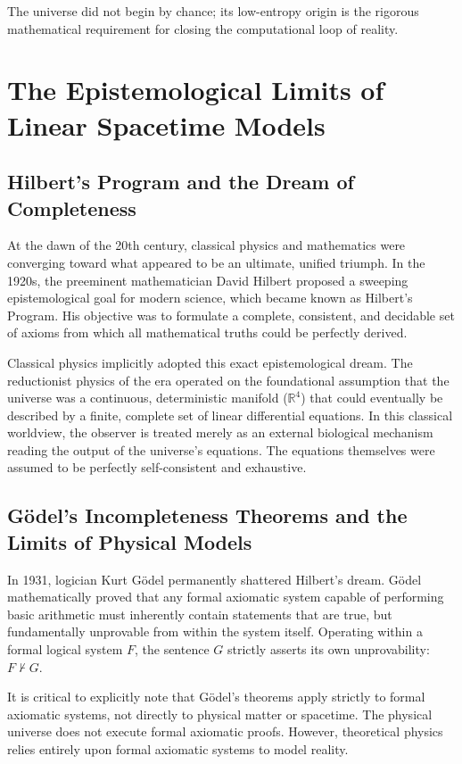 \documentclass[12pt,openany]{book}
\theoremstyle{plain}
\theoremstyle{definition}
\theoremstyle{remark}
\begin{document}
The universe did not begin by chance; its low-entropy origin is the rigorous mathematical requirement for closing the computational loop of reality.

\chapter{The Epistemological Limits of Linear Spacetime Models}

\section{Hilbert's Program and the Dream of Completeness}
At the dawn of the 20th century, classical physics and mathematics were converging toward what appeared to be an ultimate, unified triumph. In the 1920s, the preeminent mathematician David Hilbert proposed a sweeping epistemological goal for modern science, which became known as Hilbert's Program. His objective was to formulate a complete, consistent, and decidable set of axioms from which all mathematical truths could be perfectly derived.

Classical physics implicitly adopted this exact epistemological dream. The reductionist physics of the era operated on the foundational assumption that the universe was a continuous, deterministic manifold ($\mathbb{R}^4$) that could eventually be described by a finite, complete set of linear differential equations. In this classical worldview, the observer is treated merely as an external biological mechanism reading the output of the universe's equations. The equations themselves were assumed to be perfectly self-consistent and exhaustive.

\section{Gödel's Incompleteness Theorems and the Limits of Physical Models}
In 1931, logician Kurt Gödel permanently shattered Hilbert's dream. Gödel mathematically proved that any formal axiomatic system capable of performing basic arithmetic must inherently contain statements that are true, but fundamentally unprovable from within the system itself. Operating within a formal logical system $F$, the sentence $G$ strictly asserts its own unprovability: $F \not\vdash G$.

It is critical to explicitly note that Gödel's theorems apply strictly to formal axiomatic systems, not directly to physical matter or spacetime. The physical universe does not execute formal axiomatic proofs. However, theoretical physics relies entirely upon formal axiomatic systems to model reality. 
\end{document}
